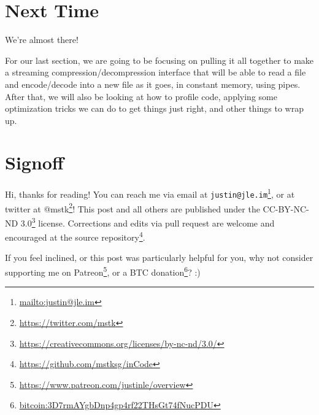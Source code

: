 \documentclass[]{article}
\renewcommand{\href}[2]{#2\footnote{\url{#1}}}
\begin{document}
\section{Next Time}\label{next-time}

We're almost there!

For our last section, we are going to be focusing on pulling it all together to
make a streaming compression/decompression interface that will be able to read a
file and encode/decode into a new file as it goes, in constant memory, using
pipes. After that, we will also be looking at how to profile code, applying some
optimization tricks we can do to get things just right, and other things to wrap
up.

\section{Signoff}\label{signoff}

Hi, thanks for reading! You can reach me via email at
\href{mailto:justin@jle.im}{\nolinkurl{justin@jle.im}}, or at twitter at
\href{https://twitter.com/mstk}{@mstk}! This post and all others are published
under the \href{https://creativecommons.org/licenses/by-nc-nd/3.0/}{CC-BY-NC-ND
3.0} license. Corrections and edits via pull request are welcome and encouraged
at \href{https://github.com/mstksg/inCode}{the source repository}.

If you feel inclined, or this post was particularly helpful for you, why not
consider \href{https://www.patreon.com/justinle/overview}{supporting me on
Patreon}, or a \href{bitcoin:3D7rmAYgbDnp4gp4rf22THsGt74fNucPDU}{BTC donation}?
:)
\end{document}
